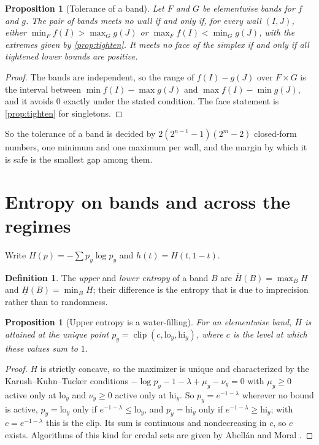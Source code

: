 \documentclass[11pt]{article}
\newtheorem{proposition}[theorem]{Proposition}
\theoremstyle{definition}
\newtheorem{definition}[theorem]{Definition}
\theoremstyle{remark}
\newcommand{\Hup}{\overline{H}}
\newcommand{\Hlo}{\underline{H}}
\begin{document}
\begin{proposition}[Tolerance of a band]\label{prop:bandsafe}
Let $F$ and $G$ be elementwise bands for $f$ and $g$. The pair of bands meets no wall if and only if, for every wall $(I,J)$,
either $\min_Ff(I)>\max_Gg(J)$ or $\max_Ff(I)<\min_Gg(J)$, with the extremes given by \cref{prop:tighten}. It meets no face of
the simplex if and only if all tightened lower bounds are positive.
\end{proposition}
\begin{proof}
The bands are independent, so the range of $f(I)-g(J)$ over $F\times G$ is the interval between $\min f(I)-\max g(J)$ and
$\max f(I)-\min g(J)$, and it avoids $0$ exactly under the stated condition. The face statement is \cref{prop:tighten} for
singletons.
\end{proof}

So the tolerance of a band is decided by $2(2^{n-1}-1)(2^m-2)$ closed-form numbers, one minimum and one maximum per wall,
and the margin by which it is safe is the smallest gap among them.

\section{Entropy on bands and across the regimes}\label{sec:entropy}

Write $H(p)=-\sum p_y\log p_y$ and $h(t)=H(t,1-t)$.

\begin{definition}\label{def:bandentropy}
The \emph{upper} and \emph{lower entropy} of a band $B$ are $\Hup(B)=\max_BH$ and $\Hlo(B)=\min_BH$; their difference is the
entropy that is due to imprecision rather than to randomness.
\end{definition}

\begin{proposition}[Upper entropy is a water-filling]\label{prop:upper}
For an elementwise band, $\Hup$ is attained at the unique point $p_y=\operatorname{clip}(c,\mathrm{lo}_y,\mathrm{hi}_y)$, where
$c$ is the level at which these values sum to $1$.
\end{proposition}
\begin{proof}
$H$ is strictly concave, so the maximizer is unique and characterized by the Karush--Kuhn--Tucker conditions
$-\log p_y-1-\lambda+\mu_y-\nu_y=0$ with $\mu_y\ge0$ active only at $\mathrm{lo}_y$ and $\nu_y\ge0$ active only at
$\mathrm{hi}_y$. So $p_y=e^{-1-\lambda}$ wherever no bound is active, $p_y=\mathrm{lo}_y$ only if $e^{-1-\lambda}\le\mathrm{lo}_y$, and
$p_y=\mathrm{hi}_y$ only if $e^{-1-\lambda}\ge\mathrm{hi}_y$; with $c=e^{-1-\lambda}$ this is the clip. Its sum is continuous and
nondecreasing in $c$, so $c$ exists. Algorithms of this kind for credal sets are given by Abellán and Moral \cite{AbellanMoral2003}.
\end{proof}
\end{document}
